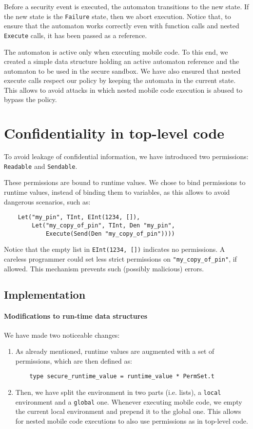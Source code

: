 Before a security event is executed, the automaton transitions to the new state. If the new state is the \lstinline{Failure} state, then we abort execution. Notice that, to ensure that the automaton works correctly even with function calls and nested \lstinline{Execute} calls, it has been passed as a reference.

The automaton is active only when executing mobile code. To this end, we created a simple data structure holding an active automaton reference and the automaton to be used in the secure sandbox.
We have also ensured that nested execute calls respect our policy by keeping the automata in the current state. This allows to avoid attacks in which nested mobile code execution is abused to bypass the policy.

\section{Confidentiality in top-level code}
\label{sec:stlc}
To avoid leakage of confidential information, we have introduced two permissions: \lstinline{Readable} and \lstinline{Sendable}.

These permissions are bound to runtime values. We chose to bind permissions to runtime values, instead of binding them to variables, as this allows to avoid dangerous scenarios, such as:
\begin{lstlisting}
    Let("my_pin", TInt, EInt(1234, []), 
        Let("my_copy_of_pin", TInt, Den "my_pin", 
            Execute(Send(Den "my_copy_of_pin"))))
\end{lstlisting}
Notice that the empty list in \lstinline{EInt(1234, [])} indicates no permissions. A careless programmer could set less strict permissions on \lstinline{"my_copy_of_pin"}, if allowed. This mechanism prevents such (possibly malicious) errors.

\subsection{Implementation}

\paragraph{Modifications to run-time data structures}
We have made two noticeable changes:
\begin{enumerate}
    \item As already mentioned, runtime values are augmented with a set of permissions, which are then defined as:
          \begin{lstlisting}
    type secure_runtime_value = runtime_value * PermSet.t
    \end{lstlisting}
    \item Then, we have split the environment in two parts (i.e. lists), a \lstinline{local} environment and a \lstinline{global} one. Whenever executing mobile code, we empty the current local environment and prepend it to the global one. This allows for nested mobile code executions to also use permissions as in top-level code.
\end{enumerate}

